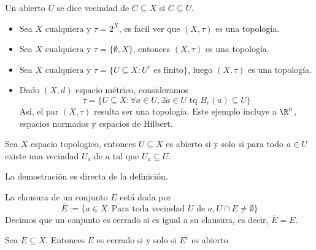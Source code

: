 \documentclass[11pt]{article}
\begin{document}
\vspace{2mm}
\noindent Un abierto $U$ se dice vecindad de $C\subseteq X$ si $C\subseteq U$.

\begin{ejm} \hspace{1mm}
    \begin{itemize}
        \item Sea $X$ cualquiera y $\tau=2^{X}$, es facil ver que $(X,\tau)$ es una topología.
        
        \item Sea $X$ cualquiera y $\tau=\{\emptyset,X\}$, entonces $(X,\tau)$ es una topología.
        
        \item Sea $X$ cualquiera y $\tau=\{U\subseteq X:U^{c}\text{ es finito}\}$, luego 
        $(X,\tau)$ es una topología.
        
        \item Dado $(X,d)$ espacio métrico, consideramos
        \begin{equation*}
            \tau=\{U\subseteq X:\forall a\in U,\exists a\in U\text{ tq }B_{r}(a)\subseteq U\}
        \end{equation*}
        Así, el par $(X,\tau)$ resulta ser una topología. Este ejemplo incluye a $\R^{n}$, 
        espacios normados y espacios de Hilbert.
    \end{itemize}
\end{ejm}

\begin{prop}
    Sea $X$ espacio topologico, entonces $U\subseteq X$ es abierto si y solo si para todo $a\in U$
    existe una vecindad $U_{a}$ de $a$ tal que $U_{a}\subseteq U$.
\end{prop}

\vspace{2mm}
\noindent La demostración es directa de la definición.

\begin{dfn}
    La clausura de un conjunto $E$ está dada por
    \begin{equation*}
        \overline{E}:=\{a\in X:\text{Para toda vecindad }U\text{ de }a,U\cap E\neq\emptyset\}
    \end{equation*}
    Decimos que un conjunto es cerrado si es igual a su clausura, es decir, $\overline{E}=E$.
\end{dfn}

\begin{prop}
    Sea $E\subseteq X$. Entonces $E$ es cerrado si y solo si $E^{c}$ es abierto.
\end{prop}
\end{document}
